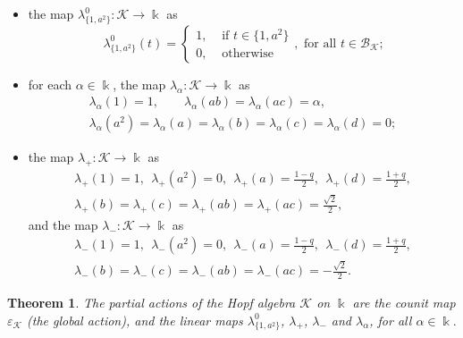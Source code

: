 \documentclass[reqno]{amsart}
\newtheorem{thm}{Theorem}[section]
\theoremstyle{definition}
\numberwithin{equation}{section}\theoremstyle{plain}
\newcommand{\B}{\mathcal{B}}
\theoremstyle{definition}
\def \k {\Bbbk}
\def \K {\mathcal{K}}
\begin{document}
\begin{itemize}
    \item the map $\lambda_{\{1,a^2\}}^0: \K \to \Bbbk$ as 
    \begin{equation}\label{lda_N}
    \lambda_{\{1,a^2\}}^0 (t) = \begin{cases}
	1, & \textrm{ if } t \in \{1,a^2\} \\ 0, & \textrm{ otherwise }\end{cases}, \textrm{ for all $t \in \B_\mathcal{K}$;} 
\end{equation}

\item for each $\alpha \in \Bbbk$, the map $\lambda_\alpha: \K \to \Bbbk$ as 
\begin{equation}\label{lda_alpha} 
\begin{split}\lambda_\alpha(1) = 1, \qquad \lambda_\alpha(ab) = \lambda_\alpha(ac) = \alpha, \\ 
\lambda_\alpha(a^2) = \lambda_\alpha(a) = \lambda_\alpha(b) = \lambda_\alpha(c) = \lambda_\alpha(d) = 0;
\end{split}
\end{equation}

\item the map $\lambda_+ : \K \to \Bbbk$ as 
\begin{equation}\label{lda_plus} 
\begin{split}
\lambda_+(1) = 1, \ \ \lambda_+(a^2) = 0, \ \
\lambda_+(a) = \tfrac{1 - q}{2}, \ \ \lambda_+(d) = \tfrac{1 + q}{2}, \\
\lambda_+(b) = \lambda_+(c) =\lambda_+(ab) = \lambda_+(ac) = \tfrac{\sqrt{2}}{2},
\end{split}
\end{equation}
and the map $\lambda_{-} : \K \to \Bbbk$ as 
\begin{equation}\label{lda_minus} 
\begin{split}
\lambda_{-}(1) = 1, \ \ \lambda_{-}(a^2) = 0, \ \
\lambda_{-}(a) = \tfrac{1 - q}{2}, \ \ \lambda_{-}(d) = \tfrac{1 + q}{2}, \\
\lambda_{-}(b) = \lambda_{-}(c) =\lambda_{-}(ab) = \lambda_{-}(ac) = -\tfrac{\sqrt{2}}{2}.
\end{split}
\end{equation}
\end{itemize}

\begin{thm}\label{acoes_parciais_K}
 The partial actions of the Hopf algebra \(\K\) on \(\k\) are the counit map \( \varepsilon_\K\) (the global action), and the linear maps $\lambda_{\{1, a^2\}}^0$, $\lambda_{+}$, $\lambda_{-}$ and $\lambda_\alpha$, for all $\alpha \in \k.$
\end{thm}
\end{document}
